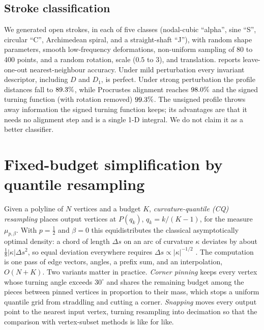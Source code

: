 \documentclass[11pt]{amsart}
\theoremstyle{definition}
\theoremstyle{remark}
\begin{document}
\subsection{Stroke classification}\label{sec:classify}
We generated \clsN{} open strokes, \clsPerClass{} in each of five classes (nodal-cubic ``alpha'', sine ``S'', circular ``C'', Archimedean spiral, and a straight-shaft ``J''), with random shape parameters, smooth low-frequency deformations, non-uniform sampling of 80 to 400 points, and a random rotation, scale ($0.5$ to $3$), and translation.  reports leave-one-out nearest-neighbour accuracy. Under mild perturbation every invariant descriptor, including $D$ and $D_1$, is perfect. Under strong perturbation the profile distances fall to $89.3\%$, while Procrustes alignment reaches $98.0\%$ and the signed turning function (with rotation removed) $99.3\%$. The unsigned profile throws away information the signed turning function keeps; its advantages are that it needs no alignment step and is a single 1-D integral. We do not claim it as a better classifier.

\begin{table}[t]
\centering\small
\caption{Leave-one-out 1-NN accuracy on \clsN{} synthetic strokes (5 classes).}
\label{tab:classify}

\end{table}

\section{Fixed-budget simplification by quantile resampling}\label{sec:resampling}

Given a polyline of $N$ vertices and a budget $K$, \emph{curvature-quantile (CQ) resampling} places output vertices at $P(q_k)$, $q_k=k/(K-1)$, for the measure $\mu_{p,\beta}$. With $p=\tfrac12$ and $\beta=0$ this equidistributes the classical asymptotically optimal density: a chord of length $\Delta s$ on an arc of curvature $\kappa$ deviates by about $\tfrac18|\kappa|\Delta s^2$, so equal deviation everywhere requires $\Delta s\propto|\kappa|^{-1/2}$ \cite{fejestoth1948,mcclure1975,glasauer1996}. The computation is one pass of edge vectors, angles, a prefix sum, and an interpolation, $O(N+K)$. Two variants matter in practice. \emph{Corner pinning} keeps every vertex whose turning angle exceeds $30^\circ$ and shares the remaining budget among the pieces between pinned vertices in proportion to their mass, which stops a uniform quantile grid from straddling and cutting a corner. \emph{Snapping} moves every output point to the nearest input vertex, turning resampling into decimation so that the comparison with vertex-subset methods is like for like.
\end{document}
